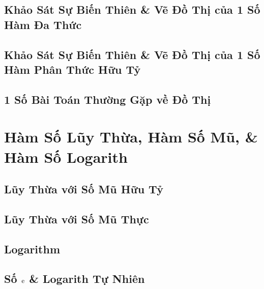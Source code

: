 \documentclass[oneside]{book}
\numberwithin{equation}{section}
\begin{document}
\section{Khảo Sát Sự Biến Thiên \& Vẽ Đồ Thị của 1 Số Hàm Đa Thức}


\section{Khảo Sát Sự Biến Thiên \& Vẽ Đồ Thị của 1 Số Hàm Phân Thức Hữu Tỷ}


\section{1 Số Bài Toán Thường Gặp về Đồ Thị}


\chapter{Hàm Số Lũy Thừa, Hàm Số Mũ, \& Hàm Số Logarith}

\section{Lũy Thừa với Số Mũ Hữu Tỷ}


\section{Lũy Thừa với Số Mũ Thực}


\section{Logarithm}


\section{Số $\rm e$ \& Logarith Tự Nhiên}
\end{document}
